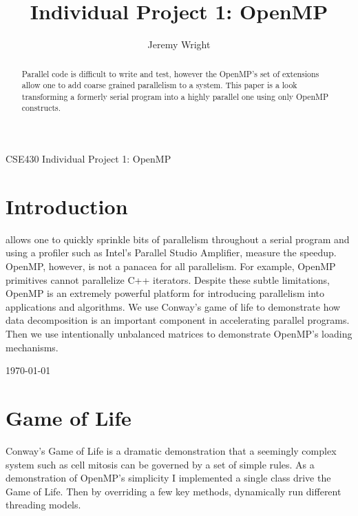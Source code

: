 \documentclass[journal,10pt,onecolumn]{IEEEtran}
\begin{document}
%
\title{Individual Project 1: OpenMP}
%

\author{Jeremy Wright}

{CSE430 Individual Project 1: OpenMP}

\maketitle


\begin{abstract}
Parallel code is difficult to write and test, however the OpenMP's set of 
extensions allow one to add coarse grained parallelism to a system. This paper 
is a look transforming a formerly serial program into a highly parallel one using 
only OpenMP constructs.
\end{abstract}

\listoffigures
\newpage 

\IEEEpeerreviewmaketitle

\section{Introduction}

 allows one to quickly sprinkle bits of parallelism throughout
a serial program and using a profiler such as Intel's Parallel Studio Amplifier, measure 
the speedup.  OpenMP, however, is not a panacea for all parallelism. For example, OpenMP primitives
cannot parallelize C++ iterators.  Despite these 
subtle limitations, OpenMP is an extremely powerful platform for introducing parallelism
into applications and algorithms.  We use Conway's game of life to demonstrate how 
data decomposition is an important component in accelerating parallel programs. Then we 
use intentionally unbalanced matrices to demonstrate OpenMP's loading mechanisms.

\hfill \today

\section{Game of Life}
Conway's Game of Life is a dramatic demonstration that a seemingly complex system
such as cell mitosis can be governed by a set of simple rules. As a demonstration of
OpenMP's simplicity I implemented a single class drive the Game of Life. Then by 
overriding a few key methods, dynamically run different threading models. 
\end{document}
